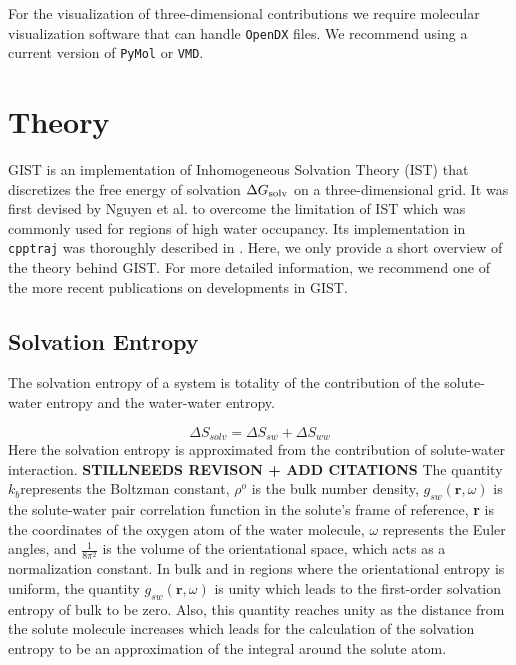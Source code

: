 \documentclass[9pt,tutorial]{livecoms}
\newcommand{\dgsolv}{\Delta G_\textup{solv}}
\newcommand{\software}{\texttt}
\begin{document}
For the visualization of three-dimensional contributions we require molecular visualization software that can handle \software{OpenDX} files.
We recommend using a current version of \software{PyMol}\cite{pymol} or \software{VMD}\cite{vmd}.
\section{Theory}
GIST is an implementation of Inhomogeneous Solvation Theory (IST) \cite{Lazaridis1998} that discretizes  the free energy of solvation $\dgsolv$ on a three-dimensional grid. 
It was first devised by Nguyen et al. \cite{Nguyen2012} to overcome the limitation of IST which was commonly used for regions of high water occupancy. 
Its implementation in \software{cpptraj} was thoroughly described in \cite{Ramsey2016}.
Here, we only provide a short overview of the theory behind GIST.
For more detailed information, we recommend one of the more recent publications on developments in GIST. \cite{Kraml2020,Chen2021}

\subsection{Solvation Entropy}
The solvation entropy of a system is totality of the contribution of the solute-water entropy and the water-water entropy. 

\begin{equation}
	\Delta S_\textit{solv} = \Delta S_\textit{sw} + \Delta S_\textit{ww}
\end{equation}
Here the solvation entropy is approximated from the contribution of solute-water interaction. 
\textbf{STILLNEEDS REVISON + ADD CITATIONS} The quantity $k_\textit{b}$represents the Boltzman constant, 
$\rho^\textit{o}$ is the bulk number density, $g_\textit{sw}\left(\textbf{r},\omega \right)$ is the solute-water 
pair correlation function in the solute's frame of reference, \textbf{r} is the coordinates of the oxygen atom of the water molecule,  
$\omega$ represents the Euler angles, and $\frac{1}{8\pi^2}$ is the volume of the orientational space, which acts as a normalization constant.
In bulk and in regions where the orientational 
entropy is uniform, the quantity $g_\textit{sw}\left(\textbf{r},\omega \right)$ is unity which leads to the first-order solvation entropy of 
bulk to be zero. Also, this quantity reaches unity as the distance from the solute molecule increases which leads for the calculation of 
the solvation entropy to be an approximation of the integral around the solute atom. 
\end{document}
